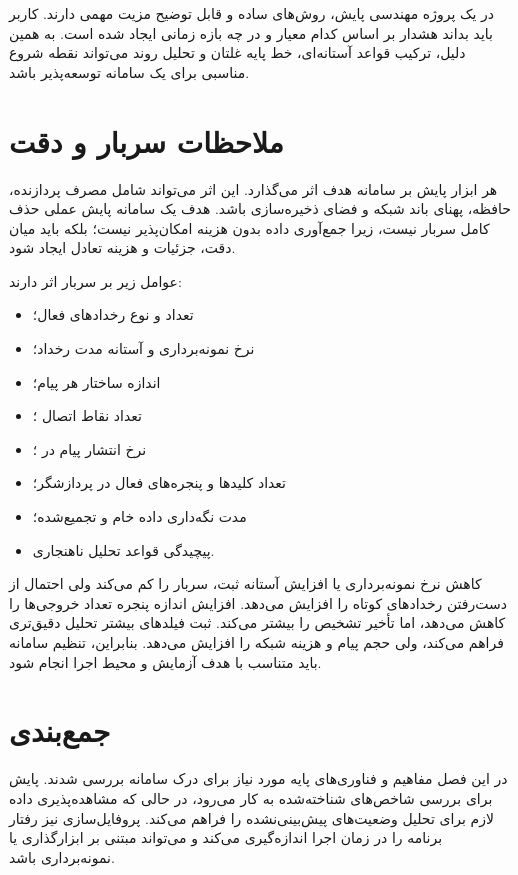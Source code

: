 در یک پروژه مهندسی پایش، روش‌های ساده و قابل توضیح مزیت مهمی دارند. کاربر باید
بداند هشدار بر اساس کدام معیار و در چه بازه زمانی ایجاد شده است. به همین دلیل،
ترکیب قواعد آستانه‌ای، خط پایه غلتان و تحلیل روند می‌تواند نقطه شروع مناسبی برای
یک سامانه توسعه‌پذیر باشد.

\section{ملاحظات سربار و دقت}
\label{sec:overhead-accuracy}

هر ابزار پایش بر سامانه هدف اثر می‌گذارد. این اثر می‌تواند شامل مصرف پردازنده،
حافظه، پهنای باند شبکه و فضای ذخیره‌سازی باشد. هدف یک سامانه پایش عملی حذف کامل
سربار نیست، زیرا جمع‌آوری داده بدون هزینه امکان‌پذیر نیست؛ بلکه باید میان دقت،
جزئیات و هزینه تعادل ایجاد شود.

عوامل زیر بر سربار اثر دارند:

\begin{itemize}
    \item تعداد و نوع رخدادهای فعال؛
    \item نرخ نمونه‌برداری و آستانه مدت رخداد؛
    \item اندازه ساختار هر پیام؛
    \item تعداد نقاط اتصال ؛
    \item نرخ انتشار پیام در ؛
    \item تعداد کلیدها و پنجره‌های فعال در پردازشگر؛
    \item مدت نگه‌داری داده خام و تجمیع‌شده؛
    \item پیچیدگی قواعد تحلیل ناهنجاری.
\end{itemize}

کاهش نرخ نمونه‌برداری یا افزایش آستانه ثبت، سربار را کم می‌کند ولی احتمال از
دست‌رفتن رخدادهای کوتاه را افزایش می‌دهد. افزایش اندازه پنجره تعداد خروجی‌ها را
کاهش می‌دهد، اما تأخیر تشخیص را بیشتر می‌کند. ثبت فیلدهای بیشتر تحلیل دقیق‌تری
فراهم می‌کند، ولی حجم پیام و هزینه شبکه را افزایش می‌دهد. بنابراین، تنظیم سامانه
باید متناسب با هدف آزمایش و محیط اجرا انجام شود.

\section{جمع‌بندی}
\label{sec:chapter2-summary}

در این فصل مفاهیم و فناوری‌های پایه مورد نیاز برای درک سامانه بررسی شدند. پایش
برای بررسی شاخص‌های شناخته‌شده به کار می‌رود، در حالی که مشاهده‌پذیری داده لازم
برای تحلیل وضعیت‌های پیش‌بینی‌نشده را فراهم می‌کند. پروفایل‌سازی نیز رفتار
برنامه را در زمان اجرا اندازه‌گیری می‌کند و می‌تواند مبتنی بر ابزارگذاری یا
نمونه‌برداری باشد.

